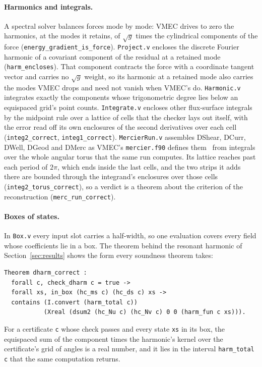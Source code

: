 \documentclass[11pt]{article}
\newcommand{\code}[1]{\texttt{#1}}
\newcommand{\sqg}{\sqrt{g}}
\begin{document}
\paragraph{Harmonics and integrals.}
A spectral solver balances forces mode by mode: VMEC drives to zero the
harmonics, at the modes it retains, of $\sqg$ times the cylindrical components
of the force (\code{energy\_gradient\_is\_force}). \code{Project.v} encloses the
discrete Fourier harmonic of a covariant component of the residual at a
retained mode (\code{harm\_encloses}). That component contracts the force with
a coordinate tangent vector and carries no $\sqg$ weight, so its harmonic at a
retained mode also carries the modes VMEC drops and need not vanish when VMEC's
do. \code{Harmonic.v} integrates
exactly the components whose trigonometric degree lies below an equispaced
grid's point counts. \code{Integrate.v} encloses other flux-surface integrals by
the midpoint rule over a lattice of cells that the checker lays out itself, with
the error read off its own enclosures of the second derivatives over each cell
(\code{integ2\_correct}, \code{integ1\_correct}). \code{MercierRun.v} assembles
DShear, DCurr, DWell, DGeod and DMerc as VMEC's \code{mercier.f90} defines
them~\cite{mercier1960,bauer1984} from integrals over the whole angular torus
that the same run computes. Its lattice reaches past each period of $2\pi$,
which ends inside the last cells, and the two strips it adds there are bounded
through the integrand's enclosures over those cells
(\code{integ2\_torus\_correct}), so a verdict is a theorem about the criterion
of the reconstruction (\code{merc\_run\_correct}).

\paragraph{Boxes of states.}
In \code{Box.v} every input slot carries a half-width, so one evaluation covers
every field whose coefficients lie in a box. The theorem behind the resonant
harmonic of Section~\ref{sec:results} shows the form every soundness theorem
takes:
\begin{verbatim}
Theorem dharm_correct :
  forall c, check_dharm c = true ->
  forall xs, in_box (hc_ms c) (hc_ds c) xs ->
  contains (I.convert (harm_total c))
           (Xreal (dsum2 (hc_Nu c) (hc_Nv c) 0 0 (harm_fun c xs))).
\end{verbatim}
For a certificate \code{c} whose check passes and every state \code{xs} in its
box, the equispaced sum of the component times the harmonic's kernel over the
certificate's grid of angles is a real number, and it lies in the interval
\code{harm\_total c} that the same computation returns.
\end{document}
